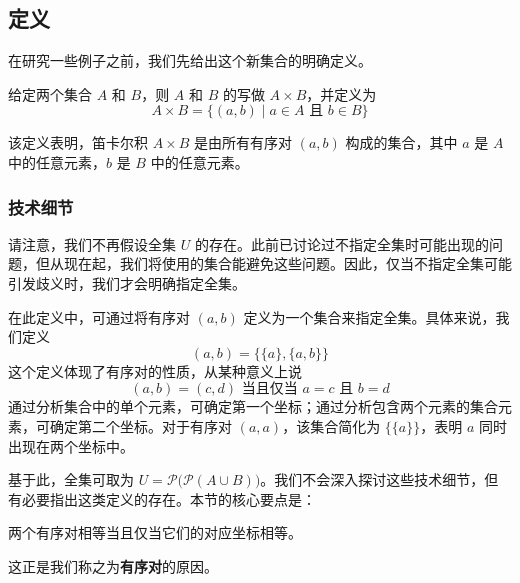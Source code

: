 \subsection{定义}

在研究一些例子之前，我们先给出这个新集合的明确定义。

\begin{definition}
    给定两个集合 $A$ 和 $B$，则 $A$ 和 $B$ 的写做 $A \times B$，并定义为
    \[A \times B = \{(a, b) \mid a \in A \text{\ 且\ } b \in B\}\]
\end{definition}

该定义表明，笛卡尔积 $A \times B$ 是由所有有序对 $(a, b)$ 构成的集合，其中 $a$ 是 $A$ 中的任意元素，$b$ 是 $B$ 中的任意元素。

\subsubsection*{技术细节}

请注意，我们不再假设全集 $U$ 的存在。此前已讨论过不指定全集时可能出现的问题，但从现在起，我们将使用的集合能避免这些问题。因此，仅当不指定全集可能引发歧义时，我们才会明确指定全集。

在此定义中，可通过将有序对 $(a, b)$ 定义为一个集合来指定全集。具体来说，我们定义
\[(a, b) = \big\{ \{a\}, \{a, b\} \big\}\]
这个定义体现了有序对的性质，从某种意义上说
\[(a, b) = (c, d) \text{\ 当且仅当\ } a = c \text{\ 且\ } b = d\]
通过分析集合中的单个元素，可确定第一个坐标；通过分析包含两个元素的集合元素，可确定第二个坐标。对于有序对 $(a, a)$，该集合简化为 $\big\{\{a\}\big\}$，表明 $a$ 同时出现在两个坐标中。

基于此，全集可取为 $U = \mathcal{P}\big(\mathcal{P}(A \cup B)\big)$。我们不会深入探讨这些技术细节，但有必要指出这类定义的存在。本节的核心要点是：
\begin{center}
    两个有序对相等当且仅当它们的对应坐标相等。
\end{center}
这正是我们称之为\textbf{有序对}的原因。
